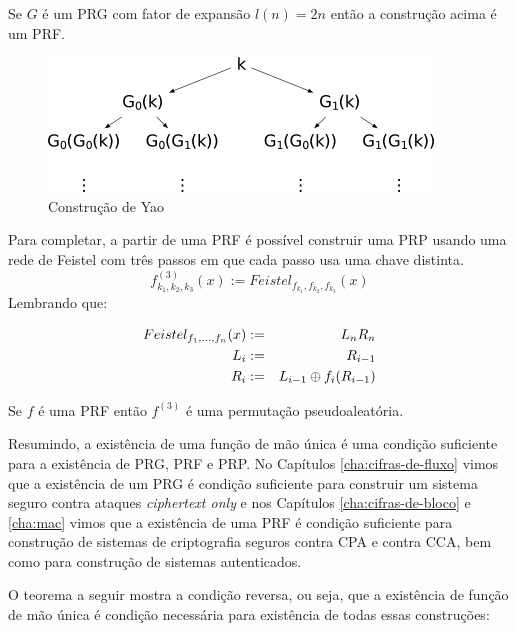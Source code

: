 \begin{theorem}[Yao]
  Se $G$ é um PRG com fator de expansão $l(n) = 2n$ então a construção acima é um PRF.
\end{theorem}

\begin{figure}[htbp]
  \centering
    \includegraphics[width=.7\textwidth]{imagens/PRG-PRF.png}
  \caption{Construção de Yao}
  \label{fig:owf-prg}
\end{figure}

Para completar, a partir de uma PRF é possível construir uma PRP usando uma rede de Feistel com três passos em que cada passo usa uma chave distinta.
\begin{displaymath}
  f_{k_1,k_2,k_3}^{(3)}(x) := Feistel_{f_{k_1},f_{k_2},f_{k_3}}(x)
\end{displaymath}
Lembrando que:

\begin{eqnarray*}
  Feistel_{f_1,\dots,f_n}(x) & := & L_nR_n\\
  L_i & := & R_{i-1}\\
  R_i & := & L_{i-1} \oplus f_i(R_{i-1})
\end{eqnarray*}


\begin{theorem}
  Se $f$ é uma PRF então $f^{(3)}$ é uma permutação pseudoaleatória.
\end{theorem}


Resumindo, a existência de uma função de mão única é uma condição suficiente para a existência de PRG, PRF e PRP.
No Capítulos \ref{cha:cifras-de-fluxo} vimos que a existência de um PRG é condição suficiente para construir um sistema seguro contra ataques {\em ciphertext only} e nos Capítulos \ref{cha:cifras-de-bloco} e \ref{cha:mac} vimos que a existência de uma PRF é condição suficiente para construção de sistemas de criptografia seguros contra CPA e contra CCA, bem como para construção de sistemas autenticados.

O teorema a seguir mostra a condição reversa, ou seja, que a existência de função de mão única é condição necessária para existência de todas essas construções:


